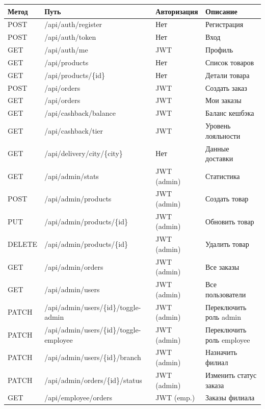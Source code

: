 \documentclass[14pt,a4paper]{extreport}
\begin{document}
\begin{longtable}{llll}
\toprule
\textbf{Метод} & \textbf{Путь} & \textbf{Авторизация} & \textbf{Описание} \\
\midrule
\endhead
POST   & /api/auth/register              & Нет         & Регистрация \\
POST   & /api/auth/token                 & Нет         & Вход \\
GET    & /api/auth/me                    & JWT         & Профиль \\
GET    & /api/products                   & Нет         & Список товаров \\
GET    & /api/products/\{id\}            & Нет         & Детали товара \\
POST   & /api/orders                     & JWT         & Создать заказ \\
GET    & /api/orders                     & JWT         & Мои заказы \\
GET    & /api/cashback/balance           & JWT         & Баланс кешбэка \\
GET    & /api/cashback/tier              & JWT         & Уровень лояльности \\
GET    & /api/delivery/city/\{city\}     & Нет         & Данные доставки \\
GET    & /api/admin/stats                & JWT (admin) & Статистика \\
POST   & /api/admin/products             & JWT (admin) & Создать товар \\
PUT    & /api/admin/products/\{id\}      & JWT (admin) & Обновить товар \\
DELETE & /api/admin/products/\{id\}      & JWT (admin) & Удалить товар \\
GET    & /api/admin/orders               & JWT (admin) & Все заказы \\
GET    & /api/admin/users                    & JWT (admin) & Все пользователи \\
PATCH  & /api/admin/users/\{id\}/toggle-admin    & JWT (admin) & Переключить роль admin \\
PATCH  & /api/admin/users/\{id\}/toggle-employee & JWT (admin) & Переключить роль employee \\
PATCH  & /api/admin/users/\{id\}/branch          & JWT (admin) & Назначить филиал \\
PATCH  & /api/admin/orders/\{id\}/status         & JWT (admin) & Изменить статус заказа \\
GET    & /api/employee/orders            & JWT (emp.)  & Заказы филиала \\

\end{longtable}
\end{document}
